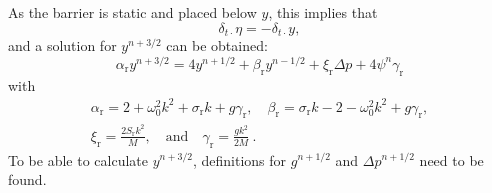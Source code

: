 As the barrier is static and placed below $y$, this implies that
\begin{equation}\label{eq:etaNegY} 
    \delta_{t\cdot}\eta = -\delta_{t\cdot}y,
\end{equation}
and a solution for $y^{n+3/2}$ can be obtained:
\begin{equation}\label{eq:lipUpdateWithCollision}
    \alpha_\text{r}y^{n+3/2} = 4 y^{n+1/2} + \beta_\text{r}y^{n-1/2} + \xi_\text{r}\Delta p + 4\psi^n\gamma_\text{r}
\end{equation}
with
\begin{gather}
    \alpha_\text{r} = 2 + \omega_0^2 k^2 + \sigma_\text{r} k + g\gamma_\text{r}, \quad \beta_\text{r} = \sigma_\text{r}k - 2 - \omega_0^2k^2 + g\gamma_\text{r}, \nonumber \\[10pt]
    \xi_\text{r} = \frac{2S_\text{r}k^2}{M}, \quad \text{and} \quad \gamma_\text{r} = \frac{gk^2}{2M}\ .\nonumber
\end{gather}
To be able to calculate $y^{n+3/2}$, definitions for $g^{n+1/2}$ and $\Delta p^{n+1/2}$ need to be found. 


